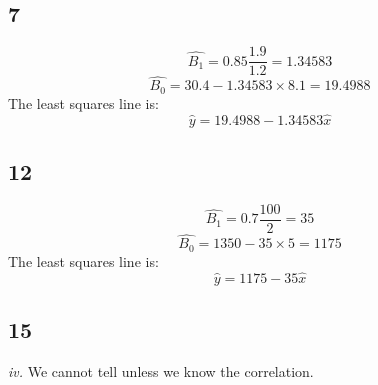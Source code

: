 \documentclass[11pt]{article}
\begin{document}
\subsection{7}
\[ \hat{B_1} = 0.85 \frac{1.9}{1.2} = 1.34583 \]
\[ \hat{B_0} = 30.4  - 1.34583 \times 8.1 = 19.4988 \] 
The least squares line is:
\[ \hat{y} = 19.4988 - 1.34583 \hat{x}  \]

\subsection{12}
\[ \hat{B_1} = 0.7 \frac{100}{2} = 35 \]
\[ \hat{B_0} = 1350 - 35 \times 5  = 1175 \]
The least squares line is:
\[ \hat{y} = 1175 - 35 \hat{x} \]
 
\subsection{15}
\textit{iv.} We cannot tell unless we know the correlation. 
\end{document}
